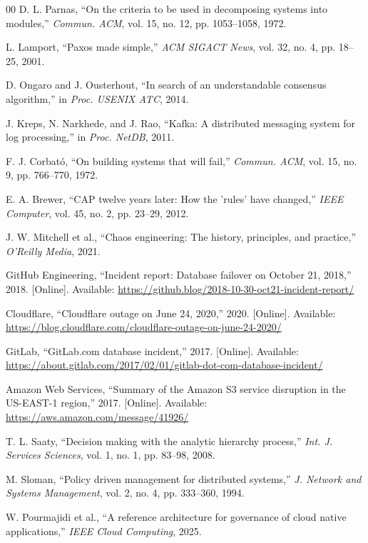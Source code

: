 \documentclass[conference]{IEEEtran}
\begin{document}
\begin{thebibliography}{00}
D. L. Parnas, ``On the criteria to be used in decomposing systems into modules,'' \textit{Commun. ACM}, vol. 15, no. 12, pp. 1053--1058, 1972.

L. Lamport, ``Paxos made simple,'' \textit{ACM SIGACT News}, vol. 32, no. 4, pp. 18--25, 2001.

D. Ongaro and J. Ousterhout, ``In search of an understandable consensus algorithm,'' in \textit{Proc. USENIX ATC}, 2014.

J. Kreps, N. Narkhede, and J. Rao, ``Kafka: A distributed messaging system for log processing,'' in \textit{Proc. NetDB}, 2011.

F. J. Corbat\'o, ``On building systems that will fail,'' \textit{Commun. ACM}, vol. 15, no. 9, pp. 766--770, 1972.

E. A. Brewer, ``CAP twelve years later: How the 'rules' have changed,'' \textit{IEEE Computer}, vol. 45, no. 2, pp. 23--29, 2012.

J. W. Mitchell et al., ``Chaos engineering: The history, principles, and practice,'' \textit{O'Reilly Media}, 2021.

GitHub Engineering, ``Incident report: Database failover on October 21, 2018,'' 2018. [Online]. Available: \url{https://github.blog/2018-10-30-oct21-incident-report/}

Cloudflare, ``Cloudflare outage on June 24, 2020,'' 2020. [Online]. Available: \url{https://blog.cloudflare.com/cloudflare-outage-on-june-24-2020/}

GitLab, ``GitLab.com database incident,'' 2017. [Online]. Available: \url{https://about.gitlab.com/2017/02/01/gitlab-dot-com-database-incident/}

Amazon Web Services, ``Summary of the Amazon S3 service disruption in the US-EAST-1 region,'' 2017. [Online]. Available: \url{https://aws.amazon.com/message/41926/}

T. L. Saaty, ``Decision making with the analytic hierarchy process,'' \textit{Int. J. Services Sciences}, vol. 1, no. 1, pp. 83--98, 2008.

M. Sloman, ``Policy driven management for distributed systems,'' \textit{J. Network and Systems Management}, vol. 2, no. 4, pp. 333--360, 1994.

W. Pourmajidi et al., ``A reference architecture for governance of cloud native applications,'' \textit{IEEE Cloud Computing}, 2025.


\end{thebibliography}
\end{document}
